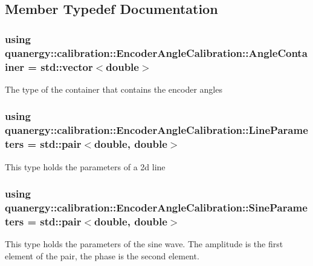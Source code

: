 \subsection{Member Typedef Documentation}
\hypertarget{structquanergy_1_1calibration_1_1EncoderAngleCalibration_ad2e08ae4ae94662029c907d43c5f879c}{
\subsubsection[{Angle\-Container}]{\setlength{\rightskip}{0pt plus 5cm}using {\bf quanergy\-::calibration\-::\-Encoder\-Angle\-Calibration\-::\-Angle\-Container} =  std\-::vector$<$double$>$}}\label{structquanergy_1_1calibration_1_1EncoderAngleCalibration_ad2e08ae4ae94662029c907d43c5f879c}
The type of the container that contains the encoder angles \hypertarget{structquanergy_1_1calibration_1_1EncoderAngleCalibration_aa41576cd5cbf0b1d917a9a781be9e308}{
\subsubsection[{Line\-Parameters}]{\setlength{\rightskip}{0pt plus 5cm}using {\bf quanergy\-::calibration\-::\-Encoder\-Angle\-Calibration\-::\-Line\-Parameters} =  std\-::pair$<$double, double$>$}}\label{structquanergy_1_1calibration_1_1EncoderAngleCalibration_aa41576cd5cbf0b1d917a9a781be9e308}
This type holds the parameters of a 2d line \hypertarget{structquanergy_1_1calibration_1_1EncoderAngleCalibration_a989e77cbef9730169908a437323a96c2}{
\subsubsection[{Sine\-Parameters}]{\setlength{\rightskip}{0pt plus 5cm}using {\bf quanergy\-::calibration\-::\-Encoder\-Angle\-Calibration\-::\-Sine\-Parameters} =  std\-::pair$<$double, double$>$}}\label{structquanergy_1_1calibration_1_1EncoderAngleCalibration_a989e77cbef9730169908a437323a96c2}
This type holds the parameters of the sine wave. The amplitude is the first element of the pair, the phase is the second element. 


